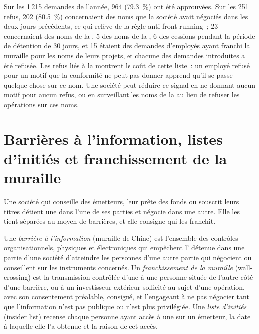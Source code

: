 Sur les 1\,215 demandes de l'année, 964 (79.3~\%) ont été approuvées. Sur les 251 refus, 202 (80.5~\%) concernaient des noms
que la société avait négociés dans les deux jours précédents, ce qui relève de la règle anti-front-running~; 23 concernaient des noms de la , 5 des noms de la , 6 des cessions pendant la période de détention de 30 jours, et 15
étaient des demandes d'employés ayant franchi la muraille pour les noms de leurs projets, et chacune des demandes introduites a été refusée. Les refus liés à la  montrent
le coût de cette liste~: un employé refusé pour un motif que la conformité ne peut pas donner apprend qu'il se passe quelque chose sur ce nom. Une société peut réduire ce
signal en ne donnant aucun motif pour aucun refus, ou en surveillant les noms de la  au lieu de refuser les opérations sur ces noms.

\section{Barrières à l'information, listes d'initiés et franchissement de la muraille}

Une société qui conseille des émetteurs, leur prête des fonds ou souscrit leurs titres détient une  dans l'une de ses parties et négocie dans une autre. Elle les tient
séparées au moyen de barrières, et elle consigne qui les franchit.

\begin{definition}\label{def:fm:compliance-and-market-abuse:barrier}
Une \emph{barrière à l'information} (muraille de Chine) est l'ensemble des contrôles organisationnels, physiques et
électroniques qui empêchent l' détenue dans une partie d'une société d'atteindre les personnes d'une autre partie qui négocient ou conseillent sur les instruments concernés. Un
\emph{franchissement de la muraille} (wall-crossing) est la transmission contrôlée d'une  à une personne située de l'autre côté d'une barrière, ou à un
investisseur extérieur sollicité au sujet d'une opération, avec son consentement préalable, consigné, et l'engageant à ne pas négocier tant que l'information n'est pas publique ou n'est plus
privilégiée. Une \emph{liste d'initiés} (insider list) recense chaque personne ayant accès à une  sur un émetteur, la date à laquelle
elle l'a obtenue et la raison de cet accès.
\end{definition}


